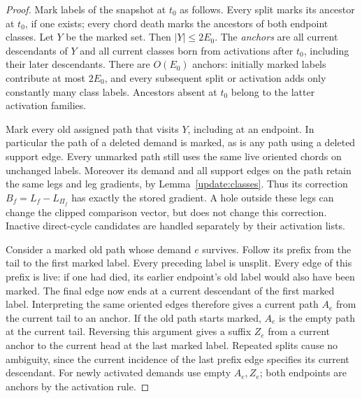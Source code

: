 \begin{proof}
Mark labels of the snapshot at $t_0$ as follows.  Every split marks its
ancestor at $t_0$, if one exists; every chord death marks the ancestors
of both endpoint classes.  Let $Y$ be the marked set.  Then
$|Y|\le2E_0$.  The \emph{anchors} are all current descendants of $Y$
and all current classes born from activations after $t_0$, including
their later descendants.  There are $O(E_0)$ anchors: initially marked
labels contribute at most $2E_0$, and every subsequent split or
activation adds only constantly many class labels.  Ancestors absent
at $t_0$ belong to the latter activation families.

Mark every old assigned path that visits $Y$, including at an endpoint.
In particular the path of a deleted demand is marked, as is any path
using a deleted support edge.  Every unmarked path still uses the same
live oriented chords on unchanged labels.  Moreover its demand and
all support edges on the path retain the same legs and leg gradients,
by Lemma~\ref{update:classes}.  Thus its correction
$B_f=L_f-L_{\Pi_f}$ has exactly the stored gradient.  A hole outside
these legs can change the clipped comparison vector, but does not
change this correction.  Inactive direct-cycle candidates are handled
separately by their activation lists.

Consider a marked old path whose demand $e$ survives.  Follow its
prefix from the tail to the first marked label.  Every preceding label
is unsplit.  Every edge of this prefix is live: if one had died, its
earlier endpoint's old label would also have been marked.  The final
edge now ends at a current descendant of the first marked label.
Interpreting the same oriented edges therefore gives a current path
$A_e$ from the current tail to an anchor.  If the old path starts
marked, $A_e$ is the empty path at the current tail.  Reversing this
argument gives a suffix $Z_e$ from a current anchor to the current head
at the last marked label.  Repeated splits cause no ambiguity, since
the current incidence of the last prefix edge specifies its current
descendant.  For newly activated demands use empty $A_e,Z_e$; both
endpoints are anchors by the activation rule.


\end{proof}
